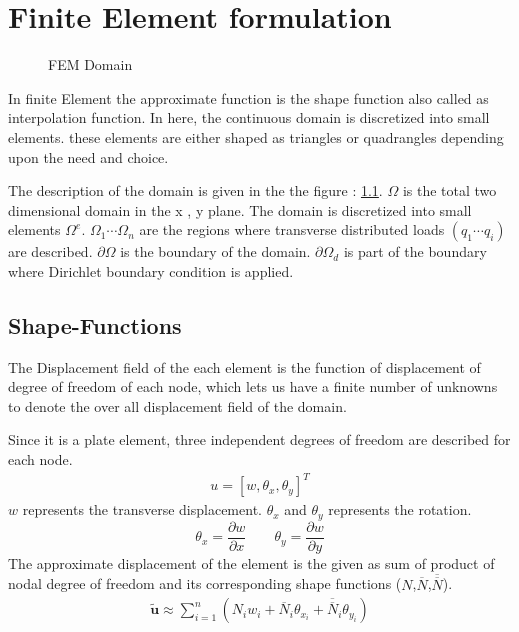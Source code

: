 \documentclass[main.tex]{subfiles}
\begin{document}
\chapter{Finite Element formulation}

\begin{figure}[h]
\centering

\caption{FEM Domain}
\label{fig:fem_domain}
\end{figure}

In finite Element the approximate function is the shape function also called as interpolation function. In here, the continuous domain is discretized into small elements. these elements are either shaped as triangles or quadrangles depending upon the need and choice.   

The description of the domain is given in the the figure : \ref{fig:fem_domain}.  $\Omega$ is the total two dimensional domain in the x , y plane. The domain is discretized into small elements $\Omega^e$. $\Omega_1 \cdots \Omega_n$ are the regions where transverse distributed loads $(q_1 \cdots q_i)$ are described. $\partial \Omega$ is the boundary of the domain. $\partial \Omega _ d$ is part of the boundary where Dirichlet boundary condition is applied. 
\section{Shape-Functions}

The Displacement field of the each element is the function of displacement of degree of freedom of each  node, which lets us have a finite number of unknowns to denote the over all displacement field of the domain. 

Since it is a plate element, three independent degrees of freedom are described for each node. 
\begin{equation*}
\begin{split}
u = \left[ w, \theta_x , \theta_y  \right]^T
\end{split}
\end{equation*}
$w$ represents the transverse displacement. $\theta_x$ and $\theta_y$ represents the rotation. 
\begin{equation}
\theta_x =\frac{\partial w}{\partial x} \qquad
 \theta_y  =\frac{\partial w}{\partial y}
\end{equation}
The approximate displacement of the element is the given as sum of product of nodal degree of freedom and its corresponding shape functions ($N$,$\overline{N}$,$\overline{\overline{N}}$).
\begin{equation}\label{eq:approx_disp}
\begin{split}
\tilde{\mathbf{u}} \approx \sum_{i=1}^{n}\left(N_iw_i+\overline{N}_i\theta_{x_i} +\overline{\overline{N}}_i\theta_{y_i}\right)
\end{split}
\end{equation}
\end{document}
